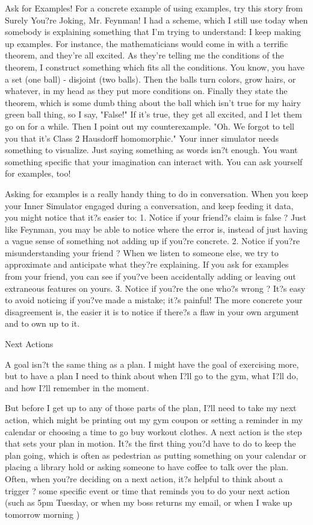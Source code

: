 Ask for Examples!
For a concrete example of using examples, try this story from Surely You?re Joking, Mr. Feynman!
I had a scheme, which I still use today when somebody is explaining something that I'm trying to understand: I keep making up examples. For instance, the mathematicians would come in with a terrific theorem, and they're all excited. As they're telling me the conditions of the theorem, I construct something which fits all the conditions. You know, you have a set (one ball) - disjoint (two balls). Then the balls turn colors, grow hairs, or whatever, in my head as they put more conditions on. Finally they state the theorem, which is some dumb thing about the ball which isn't true for my hairy green ball thing, so I say, "False!"
If it's true, they get all excited, and I let them go on for a while.  Then I point out my counterexample.  
"Oh.  We forgot to tell you that it's Class 2 Hausdorff homomorphic."
Your inner simulator needs something to visualize.  Just saying something as words isn?t enough.  You want something specific that your imagination can interact with.  You can ask yourself for examples, too!

Asking for examples is a really handy thing to do in conversation.  When you keep your Inner Simulator engaged during a conversation, and keep feeding it data, you might notice that it?s easier to:
1. Notice if your friend?s claim is false ? Just like Feynman, you may be able to notice where the error is, instead of just having a vague sense of something not adding up if you?re concrete.
2. Notice if you?re misunderstanding your friend ? When we listen to someone else, we try to approximate and anticipate what they?re explaining.  If you ask for examples from your friend, you can see if you?ve been accidentally adding or leaving out extraneous features on yours.
3. Notice if you?re the one who?s wrong ? It?s easy to avoid noticing if you?ve made a mistake; it?s painful!  The more concrete your disagreement is, the easier it is to notice if there?s a flaw in your own argument and to own up to it.

Next Actions

A goal isn?t the same thing as a plan.  I might have the goal of exercising more, but to have a plan I need to think about when I?ll go to the gym, what I?ll do, and how I?ll remember in the moment.  

But before I get up to any of those parts of the plan, I?ll need to take my next action, which might be printing out my gym coupon or setting a reminder in my calendar or choosing a time to go buy workout clothes.  A next action is the step that sets your plan in motion.  It?s the first thing you?d have to do to keep the plan going, which is often as pedestrian as putting something on your calendar or placing a library hold or asking someone to have coffee to talk over the plan.  Often, when you?re deciding on a next action, it?s helpful to think about a trigger ? some specific event or time that reminds you to do your next action (such as 5pm Tuesday, or when my boss returns my email, or when I wake up tomorrow morning )

